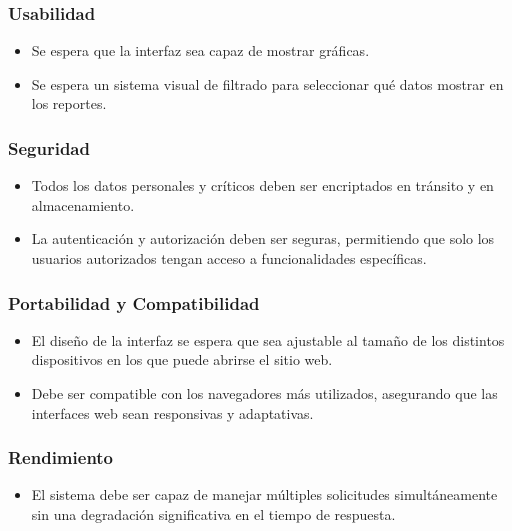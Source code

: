\documentclass{report}
\begin{document}
            \vspace{0.3cm}

            \subsubsection*{Usabilidad}
            \begin{itemize}
                \item Se espera que la interfaz sea capaz de mostrar gráficas.
                \item Se espera un sistema visual de filtrado para seleccionar qué datos mostrar en los reportes.
            \end{itemize}
        
            \subsubsection*{Seguridad}
            \begin{itemize}
                \item Todos los datos personales y críticos deben ser encriptados en tránsito y en almacenamiento.
                \item La autenticación y autorización deben ser seguras, permitiendo que solo los usuarios 
                autorizados tengan acceso a funcionalidades específicas.
            \end{itemize}
        
            \subsubsection*{Portabilidad y Compatibilidad}
            \begin{itemize}
                \item El diseño de la interfaz se espera que sea ajustable al tamaño de los distintos dispositivos 
                en los que puede abrirse el sitio web.
                \item Debe ser compatible con los navegadores más utilizados, asegurando que las interfaces web 
                sean responsivas y adaptativas.
            \end{itemize}
        
            \subsubsection*{Rendimiento}
            \begin{itemize}
                \item El sistema debe ser capaz de manejar múltiples solicitudes simultáneamente sin una degradación 
                significativa en el tiempo de respuesta.
            \end{itemize}
        
\end{document}
